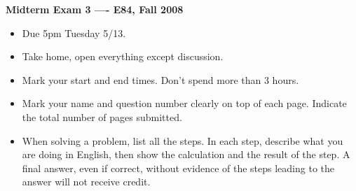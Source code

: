 \usepackage{html}

\begin{center}
{\Large \bf  Midterm Exam 3 ---- E84, Fall 2008}
\end{center}

\begin{itemize}
\item Due 5pm Tuesday 5/13.
\item Take home, open everything except discussion.
\item Mark your start and end times. Don't spend more than 3 hours.
\item Mark your name and question number clearly on top of each page.
	Indicate the total number of pages submitted.
\item When solving a problem, list all the steps. In each step, describe 
	what you are doing in English, then show the calculation and the 
	result of the step. A final answer, even if correct, without 
	evidence of the steps leading to the answer will not receive credit.
\end{itemize}


